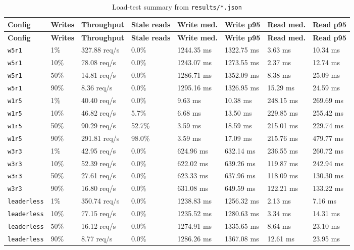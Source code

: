 \documentclass[11pt]{article}
\begin{document}
\begin{center}
\scriptsize
\begin{longtable}{p{} p{} p{} p{} p{} p{} p{} p{}}
\caption{Load-test summary from \texttt{results/*.json}}\label{tab:summary}\\
\toprule
\textbf{Config} & \textbf{Writes} & \textbf{Throughput} & \textbf{Stale reads} & \textbf{Write med.} & \textbf{Write p95} & \textbf{Read med.} & \textbf{Read p95} \\
\midrule
\endfirsthead
\toprule
\textbf{Config} & \textbf{Writes} & \textbf{Throughput} & \textbf{Stale reads} & \textbf{Write med.} & \textbf{Write p95} & \textbf{Read med.} & \textbf{Read p95} \\
\midrule
\endhead
\texttt{w5r1} & 1\% & 327.88 req/s & 0.0\% & 1244.35 ms & 1322.75 ms & 3.63 ms & 10.34 ms \\
\texttt{w5r1} & 10\% & 78.08 req/s & 0.0\% & 1243.07 ms & 1273.55 ms & 2.37 ms & 12.74 ms \\
\texttt{w5r1} & 50\% & 14.81 req/s & 0.0\% & 1286.71 ms & 1352.09 ms & 8.38 ms & 25.09 ms \\
\texttt{w5r1} & 90\% & 8.36 req/s & 0.0\% & 1295.16 ms & 1326.95 ms & 15.29 ms & 24.59 ms \\
\texttt{w1r5} & 1\% & 40.40 req/s & 0.0\% & 9.63 ms & 10.38 ms & 248.15 ms & 269.69 ms \\
\texttt{w1r5} & 10\% & 46.82 req/s & 5.7\% & 6.68 ms & 13.50 ms & 229.85 ms & 255.42 ms \\
\texttt{w1r5} & 50\% & 90.29 req/s & 52.7\% & 3.59 ms & 18.59 ms & 215.01 ms & 229.74 ms \\
\texttt{w1r5} & 90\% & 291.81 req/s & 98.0\% & 3.59 ms & 17.09 ms & 215.76 ms & 479.77 ms \\
\texttt{w3r3} & 1\% & 42.95 req/s & 0.0\% & 624.96 ms & 632.14 ms & 236.55 ms & 260.72 ms \\
\texttt{w3r3} & 10\% & 52.39 req/s & 0.0\% & 622.02 ms & 639.26 ms & 119.87 ms & 242.94 ms \\
\texttt{w3r3} & 50\% & 27.61 req/s & 0.0\% & 623.33 ms & 637.96 ms & 118.09 ms & 130.30 ms \\
\texttt{w3r3} & 90\% & 16.80 req/s & 0.0\% & 631.08 ms & 649.59 ms & 122.21 ms & 133.22 ms \\
\texttt{leaderless} & 1\% & 350.74 req/s & 0.0\% & 1238.83 ms & 1256.32 ms & 2.13 ms & 7.16 ms \\
\texttt{leaderless} & 10\% & 77.15 req/s & 0.0\% & 1235.52 ms & 1280.63 ms & 3.34 ms & 14.31 ms \\
\texttt{leaderless} & 50\% & 16.12 req/s & 0.0\% & 1274.91 ms & 1335.65 ms & 8.64 ms & 23.10 ms \\
\texttt{leaderless} & 90\% & 8.77 req/s & 0.0\% & 1286.26 ms & 1367.08 ms & 12.61 ms & 23.95 ms \\
\bottomrule
\end{longtable}
\end{center}
\end{document}
